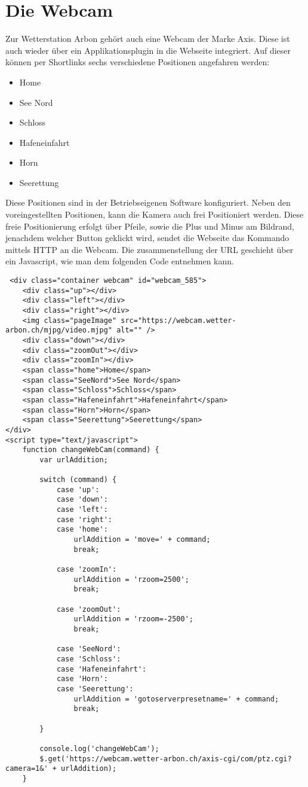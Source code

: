\section{Die Webcam}
Zur Wetterstation Arbon gehört auch eine Webcam der Marke Axis. Diese ist auch wieder über ein Applikationsplugin in die Webseite integriert. Auf dieser können per Shortlinks sechs verschiedene Positionen angefahren werden:
\begin{itemize}  
\item Home
\item See Nord
\item Schloss
\item Hafeneinfahrt
\item Horn
\item Seerettung
\end{itemize}

Diese Positionen sind in der Betriebseigenen Software konfiguriert. Neben den voreingestellten Positionen, kann die Kamera auch frei Positioniert werden. Diese freie Positionierung erfolgt über Pfeile, sowie die Plus und Minus am Bildrand, jenachdem welcher Button geklickt wird, sendet die Webseite das Kommando mittels HTTP an die Webcam. Die zusammenstellung der URL geschieht über ein Javascript, wie man dem folgenden Code entnehmen kann.
\begin{lstlisting}
 <div class="container webcam" id="webcam_585">
	<div class="up"></div>
	<div class="left"></div>
	<div class="right"></div>
	<img class="pageImage" src="https://webcam.wetter-arbon.ch/mjpg/video.mjpg" alt="" />
	<div class="down"></div>
	<div class="zoomOut"></div>
	<div class="zoomIn"></div>
	<span class="home">Home</span>
	<span class="SeeNord">See Nord</span>
	<span class="Schloss">Schloss</span>
	<span class="Hafeneinfahrt">Hafeneinfahrt</span>
	<span class="Horn">Horn</span>
	<span class="Seerettung">Seerettung</span>
</div>
<script type="text/javascript">
	function changeWebCam(command) {
		var urlAddition;
		
		switch (command) {
			case 'up':
			case 'down':
			case 'left':
			case 'right':
			case 'home':
				urlAddition = 'move=' + command;
				break;
				
			case 'zoomIn':
				urlAddition = 'rzoom=2500';
				break;
				
			case 'zoomOut':
				urlAddition = 'rzoom=-2500';
				break;
				
			case 'SeeNord':
			case 'Schloss':
			case 'Hafeneinfahrt':
			case 'Horn':
			case 'Seerettung':
				urlAddition = 'gotoserverpresetname=' + command;
				break;
				
		}
		
		console.log('changeWebCam');
		$.get('https://webcam.wetter-arbon.ch/axis-cgi/com/ptz.cgi?camera=1&' + urlAddition);
	}
\end{lstlisting}


